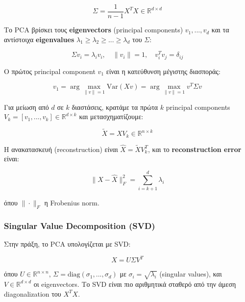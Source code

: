 \documentclass[12pt,a4paper,twoside]{book}
\begin{document}
\begin{equation}
    \Sigma = \frac{1}{n-1} X^T X \in \mathbb{R}^{d \times d}
\end{equation}

Το PCA βρίσκει τους \textbf{eigenvectors} (principal components) \(v_1, ..., v_d\) και τα αντίστοιχα \textbf{eigenvalues} \(\lambda_1 \geq \lambda_2 \geq ... \geq \lambda_d\) του \(\Sigma\):

\begin{equation}
    \Sigma v_i = \lambda_i v_i, \quad \|v_i\| = 1, \quad v_i^T v_j = \delta_{ij}
\end{equation}

Ο πρώτος principal component \(v_1\) είναι η κατεύθυνση μέγιστης διασποράς:

\begin{equation}
    v_1 = \arg\max_{\|v\|=1} \text{Var}(Xv) = \arg\max_{\|v\|=1} v^T \Sigma v
\end{equation}

Για μείωση από \(d\) σε \(k\) διαστάσεις, κρατάμε τα πρώτα \(k\) principal components \(V_k = [v_1, ..., v_k] \in \mathbb{R}^{d \times k}\) και μετασχηματίζουμε:

\begin{equation}
    \tilde{X} = X V_k \in \mathbb{R}^{n \times k}
\end{equation}

Η ανακατασκευή (reconstruction) είναι \(\hat{X} = \tilde{X} V_k^T\), και το \textbf{reconstruction error} είναι:

\begin{equation}
    \|X - \hat{X}\|_F^2 = \sum_{i=k+1}^{d} \lambda_i
\end{equation}

όπου \(\|\cdot\|_F\) η Frobenius norm.

\subsubsection*{Singular Value Decomposition (SVD)}

Στην πράξη, το PCA υπολογίζεται με SVD:

\begin{equation}
    X = U \Sigma V^T
\end{equation}

όπου \(U \in \mathbb{R}^{n \times n}\), \(\Sigma = \text{diag}(\sigma_1, ..., \sigma_d)\) με \(\sigma_i = \sqrt{\lambda_i}\) (singular values), και \(V \in \mathbb{R}^{d \times d}\) οι eigenvectors. Το SVD είναι πιο αριθμητικά σταθερό από την άμεση diagonalization του \(X^T X\).
\end{document}
